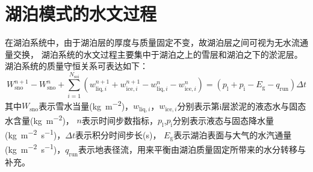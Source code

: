 \section{湖泊模式的水文过程}\label{湖泊水文}
在湖泊系统中，由于湖泊层的厚度与质量固定不变，故湖泊层之间可视为无水流通量交换，
湖泊系统的水文过程主要集中于湖泊之上的雪层和湖泊之下的淤泥层。
湖泊系统的质量守恒关系可表达如下：
\begin{equation}
  W_{\mathrm{sno}}^{n+1}-W_{\mathrm{sno}}^{n}+\sum_{i=1}^{N_{\mathrm{s o i}}}\left(w_{\mathrm{liq},i}^{n+1}+w_{\mathrm{ice},i}^{n+1}-w_{\mathrm{liq},i}^{n}-w_{\mathrm{ice},i}^{n}\right)=\left(p_{\mathrm{l}}+p_{\mathrm{i}}-E_{\mathrm{g}}-q_{\mathrm{r u n}}\right) \Delta t
\end{equation}
其中$W_{\mathrm{sno}}$表示雪水当量(\unit{kg.m^{-2}})，$w_{\mathrm{liq},i}$，$w_{\mathrm{ice},i}$分别表示第i层淤泥的液态水与固态水含量(\unit{kg.m^{-2}})，
$n$表示时间步数指标，$p_{\mathrm {l}} $,$p_{\mathrm {i}} $分别表示液态与固态降水量(\unit{kg.m^{-2}.s^{-1}})，$\Delta t$表示积分时间步长(s)，
$E_{\mathrm {g}} $表示湖泊表面与大气的水汽通量(\unit{kg.m^{-2}.s^{-1}})，$q_{\mathrm{run}}$表示地表径流，用来平衡由湖泊质量固定所带来的水分转移与补充。



